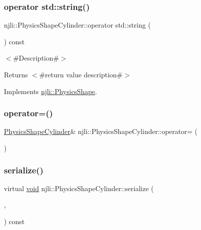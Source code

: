 \subsubsection{\texorpdfstring{operator std\+::string()}{operator std::string()}}
{\footnotesize\ttfamily njli\+::\+Physics\+Shape\+Cylinder\+::operator std\+::string (\begin{DoxyParamCaption}{ }\end{DoxyParamCaption}) const\hspace{0.3cm}{\ttfamily [virtual]}}

$<$\#\+Description\#$>$

\begin{DoxyReturn}{Returns}
$<$\#return value description\#$>$ 
\end{DoxyReturn}


Implements \mbox{\hyperlink{classnjli_1_1_physics_shape_a890d915f88af06dcf1ac1fa4f5943dc2}{njli\+::\+Physics\+Shape}}.

\mbox{\label{classnjli_1_1_physics_shape_cylinder_a0d44e40875147bc6999adf0693268099}} 
\subsubsection{\texorpdfstring{operator=()}{operator=()}}
{\footnotesize\ttfamily \mbox{\hyperlink{classnjli_1_1_physics_shape_cylinder}{Physics\+Shape\+Cylinder}}\& njli\+::\+Physics\+Shape\+Cylinder\+::operator= (\begin{DoxyParamCaption}\item[{const \mbox{\hyperlink{classnjli_1_1_physics_shape_cylinder}{Physics\+Shape\+Cylinder}} \&}]{ }\end{DoxyParamCaption})\hspace{0.3cm}{\ttfamily [protected]}}

\mbox{\label{classnjli_1_1_physics_shape_cylinder_ad7ec0be0f27ab4b0248fa1231491fd20}} 
\subsubsection{\texorpdfstring{serialize()}{serialize()}}
{\footnotesize\ttfamily virtual \mbox{\hyperlink{_thread_8h_af1e856da2e658414cb2456cb6f7ebc66}{void}} njli\+::\+Physics\+Shape\+Cylinder\+::serialize (\begin{DoxyParamCaption}\item[{\mbox{\hyperlink{_thread_8h_af1e856da2e658414cb2456cb6f7ebc66}{void}} $\ast$}]{,  }\item[{bt\+Serializer $\ast$}]{ }\end{DoxyParamCaption}) const\hspace{0.3cm}{\ttfamily [virtual]}}

